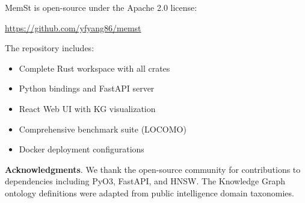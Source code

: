 MemSt is open-source under the Apache 2.0 license:
\begin{center}
\url{https://github.com/yfyang86/memst}
\end{center}

The repository includes:
\begin{itemize}
    \item Complete Rust workspace with all crates
    \item Python bindings and FastAPI server
    \item React Web UI with KG visualization
    \item Comprehensive benchmark suite (LOCOMO)
    \item Docker deployment configurations
\end{itemize}

\vspace{1em}
\noindent\textbf{Acknowledgments}. We thank the open-source community for contributions to dependencies including PyO3, FastAPI, and HNSW. The Knowledge Graph ontology definitions were adapted from public intelligence domain taxonomies.
